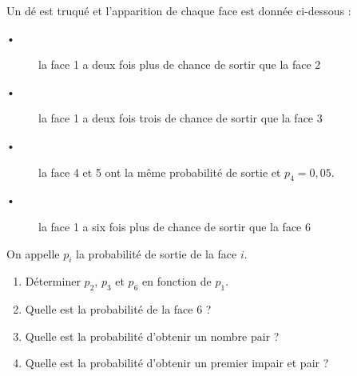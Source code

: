 
Un dé est truqué et l'apparition de chaque face est donnée ci-dessous : 

\begin{description}
\item[•] la face 1 a deux fois plus de chance de sortir que la face 2
\item[•] la face 1 a deux fois trois de chance de sortir que la face 3
\item[•] la face 4 et 5 ont la même probabilité de sortie et $p_4=0,05$.
\item[•] la face 1 a six fois plus de chance de sortir que la face 6
\end{description}

On appelle $p_i$ la probabilité de sortie de la face $i$.
\begin{enumerate}
\item Déterminer $p_2$, $p_3$ et $p_6$ en fonction de $p_1$.
\item Quelle est la probabilité de la face 6 ?
\item Quelle est la probabilité d'obtenir un nombre pair ?
\item Quelle est la probabilité d'obtenir un premier impair et pair ? 
\end{enumerate}